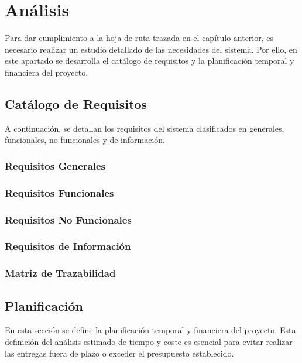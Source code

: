 \chapter{Análisis}\label{cap:analisis}
Para dar cumplimiento a la hoja de ruta trazada en el capítulo anterior, es necesario realizar un estudio detallado de las necesidades del sistema. Por ello, en este apartado se desarrolla el catálogo de requisitos y la planificación temporal y financiera del proyecto.

\section{Catálogo de Requisitos}
A continuación, se detallan los requisitos del sistema clasificados en generales, funcionales, no funcionales y de información.

\subsection{Requisitos Generales}


\subsection{Requisitos Funcionales}

\clearpage

\subsection{Requisitos No Funcionales}


\subsection{Requisitos de Información}


\subsection{Matriz de Trazabilidad}

\clearpage

\section{Planificación}
En esta sección se define la planificación temporal y financiera del proyecto. Esta definición del análisis estimado de tiempo y coste es esencial para evitar realizar las entregas fuera de plazo o exceder el presupuesto establecido. 

